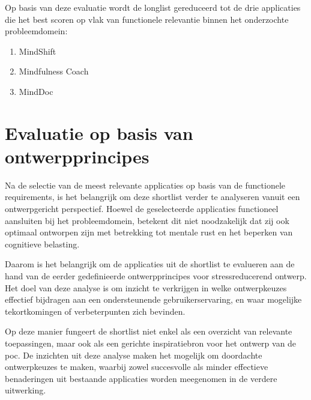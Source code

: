 \vspace{1em}

Op basis van deze evaluatie wordt de longlist gereduceerd tot de drie applicaties die het best scoren op vlak van functionele relevantie binnen het onderzochte probleemdomein:

\vspace{1em}

\begin{enumerate}
    \item MindShift
    \item Mindfulness Coach
    \item MindDoc
\end{enumerate}

\newpage

\section{Evaluatie op basis van ontwerpprincipes}
\label{sec:shortlist-evaluatie}

\vspace{1em}

Na de selectie van de meest relevante applicaties op basis van de functionele requirements, is het belangrijk om deze shortlist verder te analyseren vanuit een ontwerpgericht perspectief. Hoewel de geselecteerde applicaties functioneel aansluiten bij het probleemdomein, betekent dit niet noodzakelijk dat zij ook optimaal ontworpen zijn met betrekking tot mentale rust en het beperken van cognitieve belasting.

\vspace{1em}

Daarom is het belangrijk om de applicaties uit de shortlist te evalueren aan de hand van de eerder gedefinieerde ontwerpprincipes voor stressreducerend ontwerp. Het doel van deze analyse is om inzicht te verkrijgen in welke ontwerpkeuzes effectief bijdragen aan een ondersteunende gebruikerservaring, en waar mogelijke tekortkomingen of verbeterpunten zich bevinden.

\vspace{1em}

Op deze manier fungeert de shortlist niet enkel als een overzicht van relevante toepassingen, maar ook als een gerichte inspiratiebron voor het ontwerp van de \acrlong{poc}. De inzichten uit deze analyse maken het mogelijk om doordachte ontwerpkeuzes te maken, waarbij zowel succesvolle als minder effectieve benaderingen uit bestaande applicaties worden meegenomen in de verdere uitwerking.

